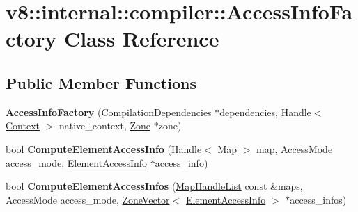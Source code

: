 \hypertarget{classv8_1_1internal_1_1compiler_1_1_access_info_factory}{}\section{v8\+:\+:internal\+:\+:compiler\+:\+:Access\+Info\+Factory Class Reference}
\label{classv8_1_1internal_1_1compiler_1_1_access_info_factory}
\subsection*{Public Member Functions}
\begin{DoxyCompactItemize}
\item 
{\bfseries Access\+Info\+Factory} (\hyperlink{classv8_1_1internal_1_1_compilation_dependencies}{Compilation\+Dependencies} $\ast$dependencies, \hyperlink{classv8_1_1internal_1_1_handle}{Handle}$<$ \hyperlink{classv8_1_1internal_1_1_context}{Context} $>$ native\+\_\+context, \hyperlink{classv8_1_1internal_1_1_zone}{Zone} $\ast$zone)\hypertarget{classv8_1_1internal_1_1compiler_1_1_access_info_factory_aafc5535293ee123adc93261670871aa2}{}\label{classv8_1_1internal_1_1compiler_1_1_access_info_factory_aafc5535293ee123adc93261670871aa2}

\item 
bool {\bfseries Compute\+Element\+Access\+Info} (\hyperlink{classv8_1_1internal_1_1_handle}{Handle}$<$ \hyperlink{classv8_1_1internal_1_1_map}{Map} $>$ map, Access\+Mode access\+\_\+mode, \hyperlink{classv8_1_1internal_1_1compiler_1_1_element_access_info}{Element\+Access\+Info} $\ast$access\+\_\+info)\hypertarget{classv8_1_1internal_1_1compiler_1_1_access_info_factory_aa7540604d39b50722ee923b8ffaf2145}{}\label{classv8_1_1internal_1_1compiler_1_1_access_info_factory_aa7540604d39b50722ee923b8ffaf2145}

\item 
bool {\bfseries Compute\+Element\+Access\+Infos} (\hyperlink{classv8_1_1internal_1_1_list}{Map\+Handle\+List} const \&maps, Access\+Mode access\+\_\+mode, \hyperlink{classv8_1_1internal_1_1_zone_vector}{Zone\+Vector}$<$ \hyperlink{classv8_1_1internal_1_1compiler_1_1_element_access_info}{Element\+Access\+Info} $>$ $\ast$access\+\_\+infos)\hypertarget{classv8_1_1internal_1_1compiler_1_1_access_info_factory_a428bf7e578848656823cdbb64a88e91a}{}\label{classv8_1_1internal_1_1compiler_1_1_access_info_factory_a428bf7e578848656823cdbb64a88e91a}


\end{DoxyCompactItemize}
